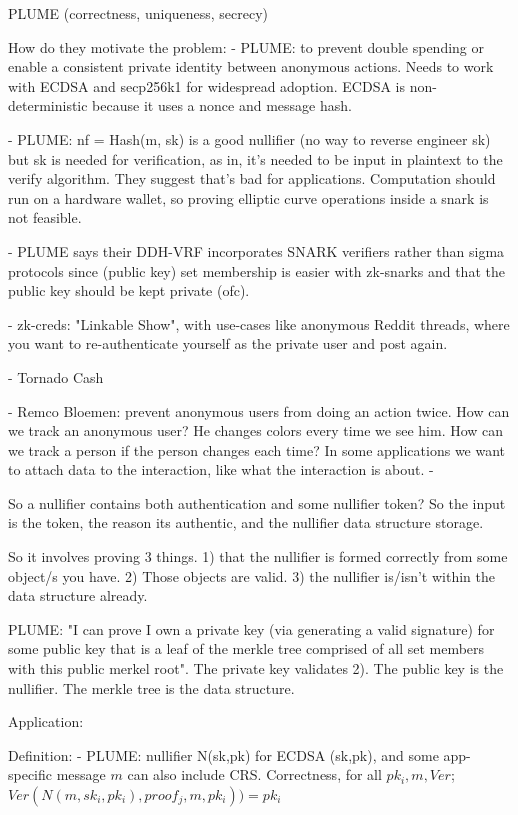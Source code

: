 PLUME (correctness, uniqueness, secrecy)

How do they motivate the problem: 
- PLUME: to prevent double spending or enable a consistent private identity between anonymous actions. Needs to work with ECDSA and secp256k1 for widespread adoption. ECDSA is non-deterministic because it uses a nonce and message hash. 

- PLUME: nf = Hash(m, sk) is a good nullifier (no way to reverse engineer sk) but sk is needed for verification, as in, it's needed to be input in plaintext to the verify algorithm. They suggest that's bad for applications. Computation should run on a hardware wallet, so proving elliptic curve operations inside a snark is not feasible. 

- PLUME says their DDH-VRF incorporates SNARK verifiers rather than sigma protocols since (public key) set membership is easier with zk-snarks and that the public key should be kept private (ofc). 

- zk-creds: "Linkable Show", with use-cases like anonymous Reddit threads, where you want to re-authenticate yourself as the private user and post again. 

- Tornado Cash

- Remco Bloemen: prevent anonymous users from doing an action twice. How can we track an anonymous user? He changes colors every time we see him. How can we track a person if the person changes each time? In some applications we want to attach data to the interaction, like what the interaction is about. 
- 


So a nullifier contains both authentication and some nullifier token? So the input is the token, the reason its authentic, and the nullifier data structure storage. 

So it involves proving 3 things. 1) that the nullifier is formed correctly from some object/s you have. 2) Those objects are valid. 3) the nullifier is/isn't within the data structure already. 

PLUME: "I can prove I own a private key (via generating a valid signature) for some public key that is a leaf of the merkle tree comprised of all set members with this public merkel root". The private key validates 2). The public key is the nullifier. The merkle tree is the data structure. 


Application: 



Definition: 
- PLUME: nullifier N(sk,pk) for ECDSA (sk,pk), and some app-specific message $m$ can also include CRS. Correctness, for all $pk_i, m, Ver$; $Ver(N(m,sk_i,pk_i), proof_j , m, pk_i)) = pk_i$

